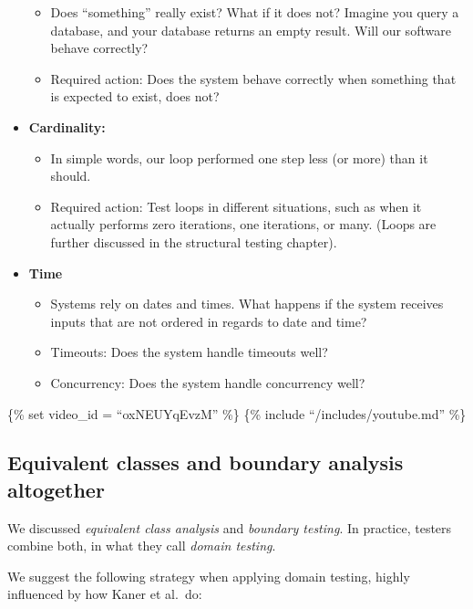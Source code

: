 \begin{itemize}
  \begin{itemize}
  \tightlist
  \item
    Does ``something'' really exist? What if it does not? Imagine you
    query a database, and your database returns an empty result. Will
    our software behave correctly?
  \item
    Required action: Does the system behave correctly when something
    that is expected to exist, does not?
  \end{itemize}
\item
  \textbf{Cardinality:}

  \begin{itemize}
  \tightlist
  \item
    In simple words, our loop performed one step less (or more) than it
    should.
  \item
    Required action: Test loops in different situations, such as when it
    actually performs zero iterations, one iterations, or many. (Loops
    are further discussed in the structural testing chapter).
  \end{itemize}
\item
  \textbf{Time}

  \begin{itemize}
  \tightlist
  \item
    Systems rely on dates and times. What happens if the system receives
    inputs that are not ordered in regards to date and time?
  \item
    Timeouts: Does the system handle timeouts well?
  \item
    Concurrency: Does the system handle concurrency well?
  \end{itemize}
\end{itemize}

\{\% set video\_id = ``oxNEUYqEvzM'' \%\} \{\% include
``/includes/youtube.md'' \%\}

\hypertarget{equivalent-classes-and-boundary-analysis-altogether}{%
\subsection{Equivalent classes and boundary analysis
altogether}\label{equivalent-classes-and-boundary-analysis-altogether}}

We discussed \emph{equivalent class analysis} and \emph{boundary
testing}. In practice, testers combine both, in what they call
\emph{domain testing}.

We suggest the following strategy when applying domain testing, highly
influenced by how Kaner et al.~do:

